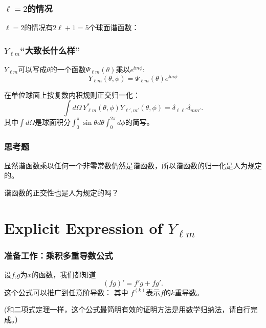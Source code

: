\documentclass[CJK]{beamer}
\begin{document}
\begin{frame}
\frametitle{$\ell = 2$的情况}

$\ell = 2$的情况有$2\ell+1=5$个球面谐函数：


\end{frame}


\begin{frame}
\frametitle{$Y_{\ell m}$“大致长什么样”}

\bitem
\item{$Y_{\ell m}$可以写成$\theta$的一个函数$\Psi_{\ell m}(\theta)$乘以$e^{\ii m\phi}$:
  {\blue $$Y_{\ell m}(\theta,\phi) = \Psi_{\ell m}(\theta)e^{\ii m\phi}$$}
}
\item{在单位球面上按复数内积规则正交归一化：
  {\blue $$\int d\Omega\,  Y_{\ell m}^*(\theta,\phi)Y_{\ell',m'}(\theta,\phi) = \delta_{\ell\ell'}\delta_{m m'} .$$}
  其中$\int d\Omega$是球面积分$\int_0^\pi \sin\theta d\theta\int_0^{2\pi}d\phi$的简写。
}  
  \eitem


\end{frame}


\begin{frame}
\frametitle{思考题}



显然谐函数乘以任何一个非零常数仍然是谐函数，所以谐函数的归一化是人为规定的。


谐函数的正交性也是人为规定的吗？


\end{frame}


\section{Explicit Expression of $Y_{\ell m}$}

\begin{frame}
  \frametitle{准备工作：乘积多重导数公式}
  
  设$f$,$g$为$x$的函数，我们都知道
  $$ (fg)' = f'g + fg'. $$
  这个公式可以推广到任意阶导数：
  其中 $f^{(k)}$表示$f$的$k$重导数。

  \skipline
  {\small \darkgreen (和二项式定理一样，这个公式最简明有效的证明方法是用数学归纳法，请自行完成。）}
  
\end{frame}
\end{document}

